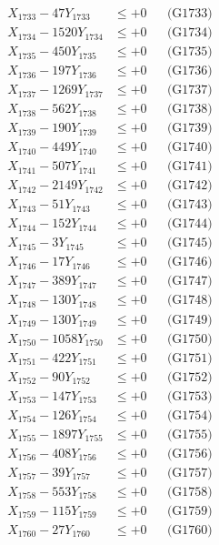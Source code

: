 \documentclass[a4paper,10pt]{article}
\begin{document}
{\begin{align}
X_{1733} - 47Y_{1733} &\leq +0 && \text{(G1733)} \\
X_{1734} - 1520Y_{1734} &\leq +0 && \text{(G1734)} \\
X_{1735} - 450Y_{1735} &\leq +0 && \text{(G1735)} \\
X_{1736} - 197Y_{1736} &\leq +0 && \text{(G1736)} \\
X_{1737} - 1269Y_{1737} &\leq +0 && \text{(G1737)} \\
X_{1738} - 562Y_{1738} &\leq +0 && \text{(G1738)} \\
X_{1739} - 190Y_{1739} &\leq +0 && \text{(G1739)} \\
X_{1740} - 449Y_{1740} &\leq +0 && \text{(G1740)} \\
\allowbreak
X_{1741} - 507Y_{1741} &\leq +0 && \text{(G1741)} \\
X_{1742} - 2149Y_{1742} &\leq +0 && \text{(G1742)} \\
X_{1743} - 51Y_{1743} &\leq +0 && \text{(G1743)} \\
X_{1744} - 152Y_{1744} &\leq +0 && \text{(G1744)} \\
X_{1745} - 3Y_{1745} &\leq +0 && \text{(G1745)} \\
X_{1746} - 17Y_{1746} &\leq +0 && \text{(G1746)} \\
X_{1747} - 389Y_{1747} &\leq +0 && \text{(G1747)} \\
X_{1748} - 130Y_{1748} &\leq +0 && \text{(G1748)} \\
X_{1749} - 130Y_{1749} &\leq +0 && \text{(G1749)} \\
X_{1750} - 1058Y_{1750} &\leq +0 && \text{(G1750)} \\
\allowbreak
X_{1751} - 422Y_{1751} &\leq +0 && \text{(G1751)} \\
X_{1752} - 90Y_{1752} &\leq +0 && \text{(G1752)} \\
X_{1753} - 147Y_{1753} &\leq +0 && \text{(G1753)} \\
X_{1754} - 126Y_{1754} &\leq +0 && \text{(G1754)} \\
X_{1755} - 1897Y_{1755} &\leq +0 && \text{(G1755)} \\
X_{1756} - 408Y_{1756} &\leq +0 && \text{(G1756)} \\
X_{1757} - 39Y_{1757} &\leq +0 && \text{(G1757)} \\
X_{1758} - 553Y_{1758} &\leq +0 && \text{(G1758)} \\
X_{1759} - 115Y_{1759} &\leq +0 && \text{(G1759)} \\
X_{1760} - 27Y_{1760} &\leq +0 && \text{(G1760)} \\

\end{align}}
\end{document}
